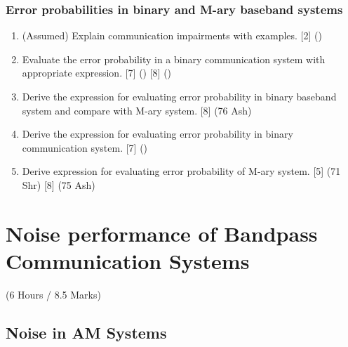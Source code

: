 \documentclass[12pt]{article}
\begin{document}
    \subsubsection{Error probabilities in binary and M-ary baseband systems}
      \begin{enumerate}
        \item (Assumed) Explain communication impairments with examples. \hfill [2] ()
        
        \item Evaluate the error probability in a binary communication system with appropriate expression. \hfill [7] () [8] ()

        \item Derive the expression for evaluating error probability in binary baseband system and compare with M-ary system. \hfill [8] (76 Ash)
        
        \item Derive the expression for evaluating error probability in binary communication system. \hfill [7] ()
        
        \item Derive expression for evaluating error probability of M-ary system. \hfill [5] (71 Shr) [8] (75 Ash)
      \end{enumerate}

\pagebreak

\section{Noise performance of Bandpass Communication Systems}
  \begin{center}(6 Hours / 8.5 Marks)\end{center}

  \subsection{Noise in AM Systems}
\end{document}

